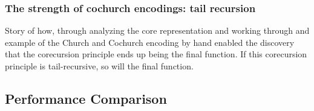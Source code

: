 \subsubsection{The strength of cochurch encodings: tail recursion}\label{sec:tail}
Story of how, through analyzing the core representation and working through and example of the Church and Cochurch encoding by hand enabled the discovery that the corecursion principle ends up being the final function.
If this corecursion principle is tail-recursive, so will the final function.

\subsection{Performance Comparison}



\iffalse
I analyzed the core representation:
- Leaf trees don't fuse nicely for the functions given
- Lists don't fuse nicely due to filter not fusing. Two solutions:
    - Join point optimization: In Haskell this should've worked already, but doesn't :(
    - Make the cons constructor 'skippable'. This way we can implement filter as a natural transformation. Filter now fuses nicely.
- Now that everything is fused, there is still one potential optimization remainin for the core representation: Tail recursion.
    - The (co)recursion principle that get defined for (co)church encodings, can sometimes be rewritten to be tail recrusive.
    - For Cochurch encodings this seems to be easier in some cases. Especially when working with functions that can calculate a result.
    - For Church encodings this is harder, as we need to make an accumulator that stores a part of the data structure that can later be expanded.
\fi


